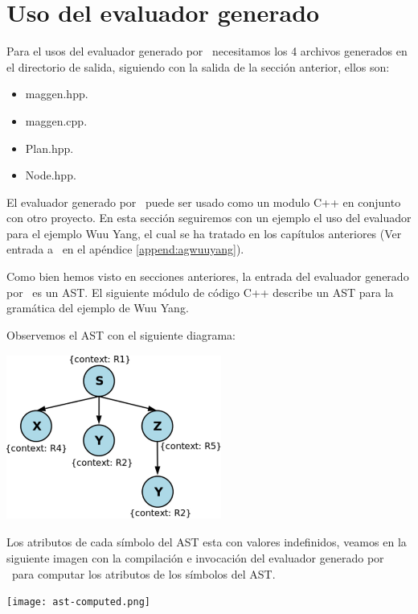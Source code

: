 \section{Uso del evaluador generado}

Para el usos del evaluador generado por \maggen\ necesitamos los 4 archivos generados en el directorio de salida, siguiendo con la salida de la sección anterior, ellos son:
\begin{itemize}
\item maggen.hpp.
\item maggen.cpp.
\item Plan.hpp.
\item Node.hpp.
\end{itemize}

El evaluador generado por \maggen\ puede ser usado como un modulo C++ en conjunto con otro proyecto. En esta sección seguiremos con un ejemplo el uso del evaluador para el ejemplo Wuu Yang, el cual se ha tratado en los capítulos anteriores (Ver entrada a \maggen\ en el apéndice \ref{append:agwuuyang}).

Como bien hemos visto en secciones anteriores, la entrada del evaluador generado por \maggen\ es un AST. El siguiente módulo de código C++ describe un AST para la gramática del ejemplo de Wuu Yang.



Observemos el AST con el siguiente diagrama:

\begin{center}
\includegraphics[width=200pt,height=154pt]{ast.png}
\end{center}

Los atributos de cada símbolo del AST esta con valores indefinidos, veamos en la siguiente imagen con la compilación e invocación del evaluador generado por \maggen\ para computar los atributos de los símbolos del AST.

\begin{center}
\texttt{[image: ast-computed.png]}
\end{center} 

